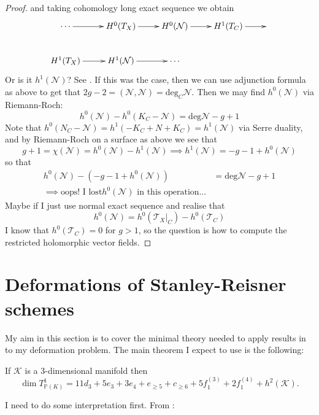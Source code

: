\begin{proof}
and taking cohomology long exact sequence we
obtain
$$
\xymatrix{
\cdots\ar[r]&H^{0}(T_X)\ar[r]&H^{0}
(\mathcal{N})\ar[r]&H^{1}(T_C)\ar[r]&\\
H^{1}(T_X)\ar[r]&H^{1}(\mathcal{N})\ar[r]&
\cdots
}
$$
\medskip\noindent
Or is it $h^1(\mathcal{N})$? See
\cite{HarrMorr}. If this was the case, then
we
can use adjunction formula as above to get
that
$2g-2=(\mathcal{N},\mathcal{N})=\text{deg}_C
\mathcal{N}$. Then we may find
$h^0(\mathcal{N})$ via Riemann-Roch:
$$
h^0(\mathcal{N})-h^0(K_C-\mathcal{N})=
\text{deg}\mathcal{N}-g+1
$$
Note that
$h^0(N_C-\mathcal{N})=h^1(-K_C+N+K_C)=
h^1(\mathcal{N})$
via Serre
duality, and by Riemann-Roch on a surface as
above we see that
$$
g+1=\chi(\mathcal{N})=h^0(\mathcal{N})-
h^1(\mathcal{N})
\implies
h^1(\mathcal{N})=-g-1+h^0(\mathcal{N})
$$
so that
$$
\begin{aligned}
h^0(\mathcal{N})-(-g-1+h^0(\mathcal{N}))&=
\text{deg}\mathcal{N}-g+1\\
\implies \text{oops! I lost
$h^0(\mathcal{N})$ in this operation…}
\end{aligned}
$$
Maybe if I just use normal exact sequence and
realise that
$$
h^0(\mathcal{N})=h^0(\mathcal{T}_X|_{C})-
h^0(\mathcal{T}_C)
$$
I know that $h^0(\mathcal{T}_C)=0$ for $g>1$,
so the question is how to compute
the restricted holomorphic vector fields.
\end{proof}

\section{Deformations of Stanley-Reisner schemes}
\label{section-sr}

\noindent
My aim in this section is to cover the
minimal
theory needed to apply results in \cite{jan2}
to my deformation problem. The main theorem
I expect to use is the following:

\begin{theorem}
\label{theorem-deformations-threefolds}
\begin{reference}
\cite[Theorem 5.7]{jan2}
\end{reference}
If $\mathcal{K}$ is a 3-dimensional manifold
then
$$
\dim T^1_{\mathbb{P}(K)}
=11d_3+5e_3+3e_4+e_{\geq 5}+c_{\geq
6}+5f_1^{(3)}+2f_1^{(4)}+h^2(\mathcal{K}).
$$
\end{theorem}

\noindent
I need to do some interpretation first.
From \cite[p. 1]{jan3}:

